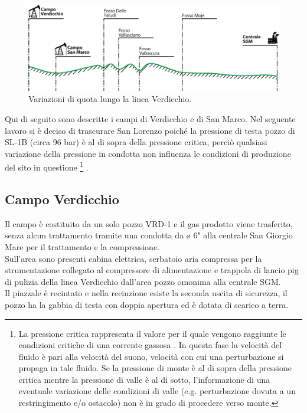 \begin{figure}[htbp]
	\centering
    \includegraphics[width=\textwidth]{fig/test/linea-vrd-quota.eps}
 	\caption{Variazioni di quota lungo la linea Verdicchio.}
 	\label{fig:quota-linea-vrd}
\end{figure}

Qui di seguito sono descritte i campi di Verdicchio e di San Marco. Nel seguente lavoro si è deciso di trascurare San Lorenzo poiché la pressione di testa pozzo di SL-1B (circa 96 bar) è al di sopra della pressione critica, perciò qualsiasi variazione della pressione in condotta non influenza le condizioni di produzione del sito in questione
\footnote{La pressione critica rappresenta il valore per il quale vengono raggiunte le condizioni critiche di una corrente gassosa \parencite{sabetta2009gasdinamica}. In questa fase la velocità del fluido è pari alla velocità del suono, velocità con cui una perturbazione si propaga in tale fluido. Se la pressione di monte è al di sopra della pressione critica mentre la pressione di valle è al di sotto, l'informazione di una eventuale variazione delle condizioni di valle (e.g. perturbazione dovuta a un restringimento e/o ostacolo) non è in grado di procedere verso monte.}
.

\subsection{Campo Verdicchio}
Il campo è costituito da un solo pozzo VRD-1 e il gas prodotto viene trasferito, senza alcun trattamento tramite una condotta da ø 6" alla centrale San Giorgio Mare per il trattamento e la compressione.\\
Sull'area sono presenti cabina elettrica, serbatoio aria compressa per la strumentazione collegato al compressore di alimentazione e trappola di lancio pig di pulizia della linea Verdicchio dall'area pozzo omonima alla centrale SGM.\\
Il piazzale è recintato e nella recinzione esiste la seconda uscita di sicurezza, il pozzo ha la gabbia di testa con doppia apertura ed è dotata di scarico a terra.


